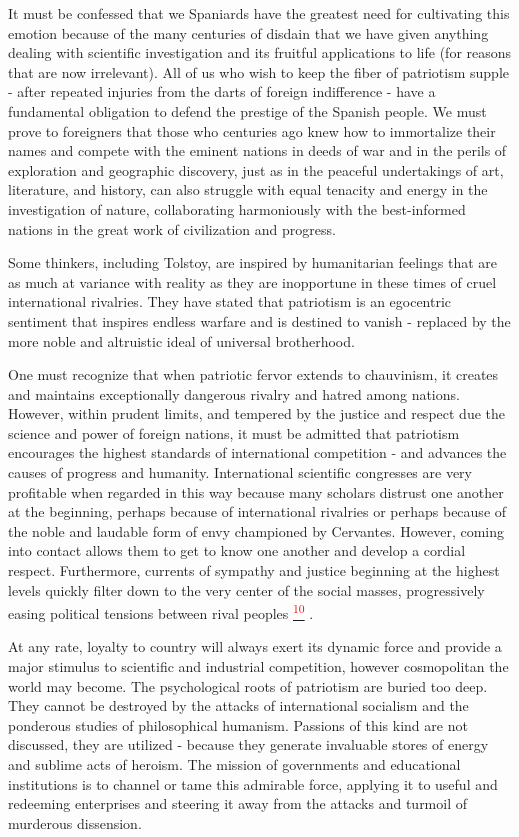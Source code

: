 \documentclass{article}
\newcommand{\noteref}[1]{%
 \hypertarget{ref:#1}{}%
 \hyperlink{note:#1}{\textsuperscript{\textcolor{red}{#1}}}%
}
\begin{document}
It must be confessed that we Spaniards have the greatest need for cultivating this emotion because of the many centuries of disdain that we have given anything dealing with scientific investigation and its fruitful applications to life (for reasons that are now irrelevant). All of us who wish to keep the fiber of patriotism supple - after repeated injuries from the darts of foreign indifference - have a fundamental obligation to defend the prestige of the Spanish people. We must prove to foreigners that those who centuries ago knew how to immortalize their names and compete with the eminent nations in deeds of war and in the perils of exploration and geographic discovery, just as in the peaceful undertakings of art, literature, and history, can also struggle with equal tenacity and energy in the investigation of nature, collaborating harmoniously with the best-informed nations in the great work of civilization and progress.

Some thinkers, including Tolstoy, are inspired by humanitarian feelings that are as much at variance with reality as they are inopportune in these times of cruel international rivalries. They have stated that patriotism is an egocentric sentiment that inspires endless warfare and is destined to vanish - replaced by the more noble and altruistic ideal of universal brotherhood.

One must recognize that when patriotic fervor extends to chauvinism, it creates and maintains exceptionally dangerous rivalry and hatred among nations. However, within prudent limits, and tempered by the justice and respect due the science and power of foreign nations, it must be admitted that patriotism encourages the highest standards of international competition - and advances the causes of progress and humanity. International scientific congresses are very profitable when regarded in this way because many scholars distrust one another at the beginning, perhaps because of international rivalries or perhaps because of the noble and laudable form of envy championed by Cervantes. However, coming into contact allows them to get to know one another and develop a cordial respect. Furthermore, currents of sympathy and justice beginning at the highest levels quickly filter down to the very center of the social masses, progressively easing political tensions between rival peoples\noteref{10}.

At any rate, loyalty to country will always exert its dynamic force and provide a major stimulus to scientific and industrial competition, however cosmopolitan the world may become. The psychological roots of patriotism are buried too deep. They cannot be destroyed by the attacks of international socialism and the ponderous studies of philosophical humanism. Passions of this kind are not discussed, they are utilized - because they generate invaluable stores of energy and sublime acts of heroism. The mission of governments and educational institutions is to channel or tame this admirable force, applying it to useful and redeeming enterprises and steering it away from the attacks and turmoil of murderous dissension.
\end{document}
